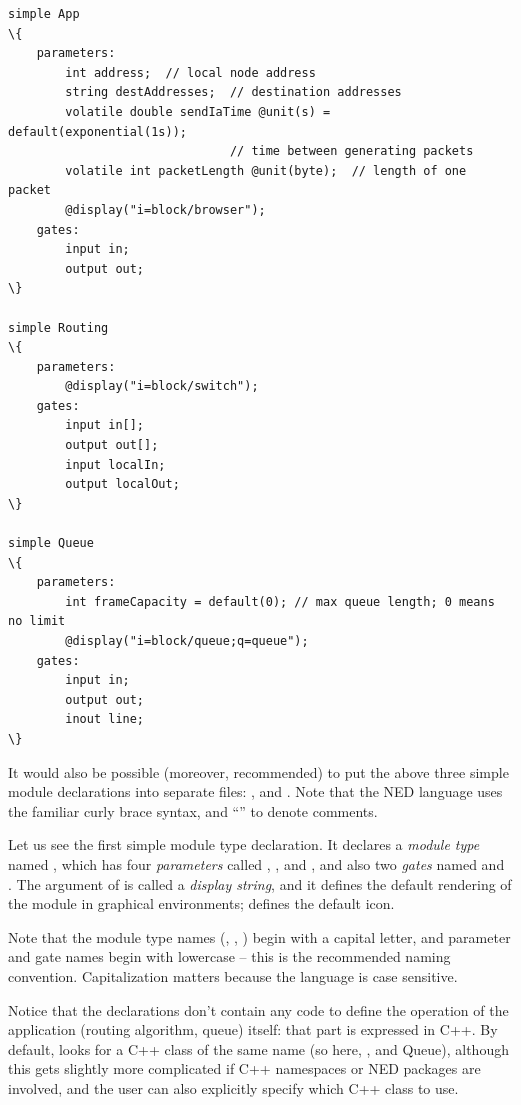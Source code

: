 \begin{Verbatim}[commandchars=\\\{\}]
simple App
\{
    parameters:
        int address;  // local node address
        string destAddresses;  // destination addresses
        volatile double sendIaTime @unit(s) = default(exponential(1s));
                               // time between generating packets
        volatile int packetLength @unit(byte);  // length of one packet
        @display("i=block/browser");
    gates:
        input in;
        output out;
\}

simple Routing
\{
    parameters:
        @display("i=block/switch");
    gates:
        input in[];
        output out[];
        input localIn;
        output localOut;
\}

simple Queue
\{
    parameters:
        int frameCapacity = default(0); // max queue length; 0 means no limit
        @display("i=block/queue;q=queue");
    gates:
        input in;
        output out;
        inout line;
\}
\end{Verbatim}

It would also be possible (moreover, recommended) to put the above three
simple module declarations into separate  files: ,
 and . Note that the NED language uses
the familiar curly brace syntax, and ``\ttt{//}'' to denote comments.

Let us see the first simple module type declaration. It declares a
\textit{module type} named , which has four \textit{parameters}
called , ,  and ,
and also two \textit{gates} named  and . The argument of
 is called a \textit{display string}, and it defines
the default rendering of the module in graphical environments;
 defines the default icon.

\begin{note}
    Note that the module type names (, , )
    begin with a capital letter, and parameter and gate names begin with
    lowercase -- this is the recommended naming convention. Capitalization
    matters because the language is case sensitive.
\end{note}

Notice that the declarations don't contain any code to define the operation
of the application (routing algorithm, queue) itself:
that part is expressed in C++. By default, {\opp} looks for a
C++ class of the same name (so here, ,  and {Queue}),
although this gets slightly more complicated if C++ namespaces or
NED packages are involved, and the user can also explicitly specify
which C++ class to use.

